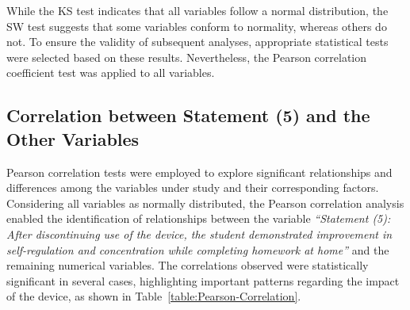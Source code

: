                 While the KS test indicates that all variables follow a normal distribution, the SW test suggests that some variables conform to normality, whereas others do not. To ensure the validity of subsequent analyses, appropriate statistical tests were selected based on these results. Nevertheless, the Pearson correlation coefficient test was applied to all variables.
                
                \subsection{Correlation between Statement (5) and the Other Variables}
                Pearson correlation tests were employed to explore significant relationships and differences among the variables under study and their corresponding factors. Considering all variables as normally distributed, the Pearson correlation analysis enabled the identification of relationships between the variable \textit{``Statement (5): \textit{After discontinuing use of the device, the student demonstrated improvement in self-regulation and concentration while completing homework at home}''} and the remaining numerical variables. The correlations observed were statistically significant in several cases, highlighting important patterns regarding the impact of the device, as shown in Table~\ref{table:Pearson-Correlation}.
                
